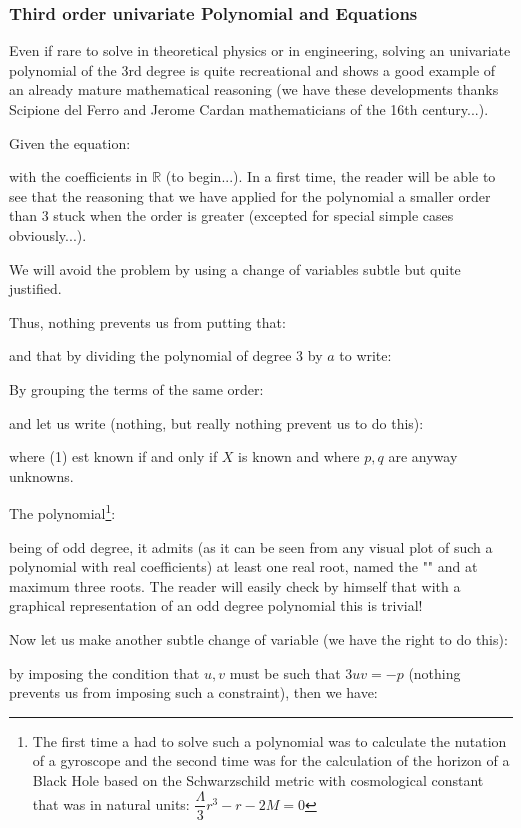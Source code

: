 	\subsubsection{Third order univariate Polynomial and Equations}
	Even if rare to solve in theoretical physics or in engineering, solving an univariate polynomial of the $3$rd degree is quite recreational and shows a good example of an already mature mathematical reasoning (we have these developments thanks Scipione del Ferro and Jerome Cardan mathematicians of the 16th century...).
	
	Given the equation:
	
	with the coefficients in $\mathbb{R}$ (to begin...). In a first time, the reader will be able to see that the reasoning that we have applied for the polynomial a smaller order than $3$ stuck when the order is greater (excepted for special simple cases obviously...).

	We will avoid the problem by using a change of variables subtle but quite justified.
	
	Thus, nothing prevents us from putting that:
	
	and that by dividing the polynomial of degree 3 by $a$ to write:
	
	By grouping the terms of the same order:
	
	and let us write (nothing, but really nothing prevent us to do this):
	
	where (1) est known if and only if $X$ is known and where $p,q$ are anyway unknowns.

	The polynomial\footnote{The first time a had to solve such a polynomial was to calculate the nutation of a gyroscope and the second time was for the calculation of the horizon of a Black Hole based on the Schwarzschild metric with cosmological constant that was in natural units: $\dfrac{\Lambda}{3}r^3-r-2M=0$}:
	
	being of odd degree, it admits (as it can be seen from any visual plot of such a polynomial with real coefficients) at least one real root, named the "" and at maximum three roots. The reader will easily check by himself that with a graphical representation of an odd degree polynomial this is trivial!
	
	Now let us make another subtle change of variable (we have the right to do this):
	
	by imposing the condition that $u, v$ must be such that $3uv=-p$ (nothing prevents us from imposing such a constraint), then we have:
	
